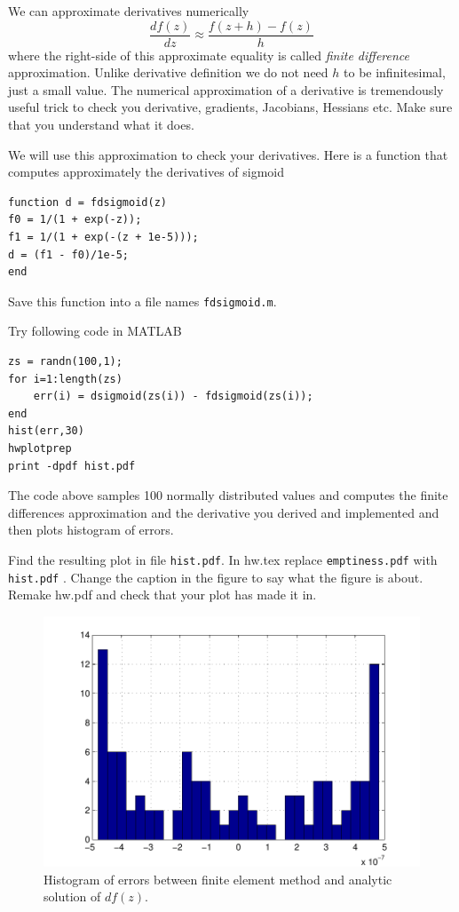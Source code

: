 \documentclass{article}
\begin{document}
\newproblem{1pt}
We can approximate derivatives numerically
\[
\frac{df(z)}{dz}\approx \frac{f(z+h) - f(z)}{h}
\]
where the right-side of this approximate equality is called {\em finite difference} approximation. Unlike derivative definition we do not need $h$ to be infinitesimal, just a small value. The numerical approximation of a derivative is tremendously useful trick to check you derivative, gradients, Jacobians, Hessians etc. Make sure that you understand what it does.

We will use this approximation to check your derivatives. Here is a function that computes approximately the derivatives of sigmoid
\begin{verbatim}
function d = fdsigmoid(z)
f0 = 1/(1 + exp(-z));
f1 = 1/(1 + exp(-(z + 1e-5)));
d = (f1 - f0)/1e-5;
end
\end{verbatim}
Save this function into a file names \texttt{fdsigmoid.m}.

Try following code in MATLAB
\begin{verbatim}
zs = randn(100,1);
for i=1:length(zs)
    err(i) = dsigmoid(zs(i)) - fdsigmoid(zs(i));
end
hist(err,30)
hwplotprep
print -dpdf hist.pdf
\end{verbatim}
The code above samples 100 normally distributed values and computes the finite differences approximation and the derivative you derived and implemented and then plots histogram of errors.

Find the resulting plot in file {\tt hist.pdf}. In hw\theHW.tex replace {\tt emptiness.pdf} with {\tt hist.pdf} . Change the
caption in the figure to say what the figure is about. Remake hw\theHW.pdf and check that your plot has made it in.
\begin{figure}[H]
\begin{center}
\includegraphics[scale=0.5]{hist.pdf}
\caption{Histogram of errors between finite element method and analytic solution of $df(z)$.}
\end{center}
\end{figure}
\end{document}

